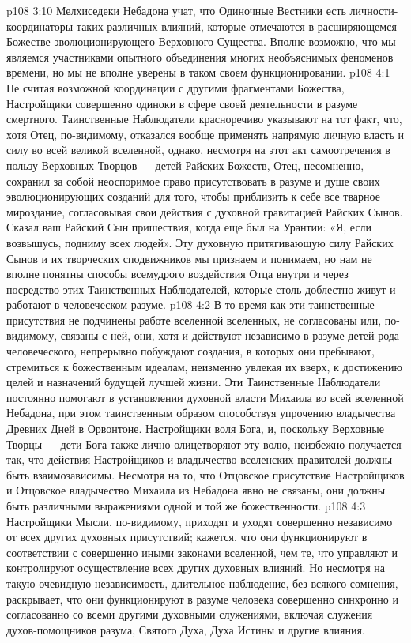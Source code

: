 \vs p108 3:10 Мелхиседеки Небадона учат, что Одиночные Вестники есть личности\hyp{}координаторы таких различных влияний, которые отмечаются в расширяющемся Божестве эволюционирующего Верховного Существа. Вполне возможно, что мы являемся участниками опытного объединения многих необъяснимых феноменов времени, но мы не вполне уверены в таком своем функционировании.
\vs p108 4:1 Не считая возможной координации с другими фрагментами Божества, Настройщики совершенно одиноки в сфере своей деятельности в разуме смертного. Таинственные Наблюдатели красноречиво указывают на тот факт, что, хотя Отец, по\hyp{}видимому, отказался вообще применять напрямую личную власть и силу во всей великой вселенной, однако, несмотря на этот акт самоотречения в пользу Верховных Творцов --- детей Райских Божеств, Отец, несомненно, сохранил за собой неоспоримое право присутствовать в разуме и душе своих эволюционирующих созданий для того, чтобы приблизить к себе все тварное мироздание, согласовывая свои действия с духовной гравитацией Райских Сынов. Сказал ваш Райский Сын пришествия, когда еще был на Урантии: «Я, если возвышусь, подниму всех людей». Эту духовную притягивающую силу Райских Сынов и их творческих сподвижников мы признаем и понимаем, но нам не вполне понятны способы всемудрого воздействия Отца внутри и через посредство этих Таинственных Наблюдателей, которые столь доблестно живут и работают в человеческом разуме.
\vs p108 4:2 В то время как эти таинственные присутствия не подчинены работе вселенной вселенных, не согласованы или, по\hyp{}видимому, связаны с ней, они, хотя и действуют независимо в разуме детей рода человеческого, непрерывно побуждают создания, в которых они пребывают, стремиться к божественным идеалам, неизменно увлекая их вверх, к достижению целей и назначений будущей лучшей жизни. Эти Таинственные Наблюдатели постоянно помогают в установлении духовной власти Михаила во всей вселенной Небадона, при этом таинственным образом способствуя упрочению владычества Древних Дней в Орвонтоне. Настройщики  воля Бога, и, поскольку Верховные Творцы --- дети Бога также лично олицетворяют эту волю, неизбежно получается так, что действия Настройщиков и владычество вселенских правителей должны быть взаимозависимы. Несмотря на то, что Отцовское присутствие Настройщиков и Отцовское владычество Михаила из Небадона явно не связаны, они должны быть различными выражениями одной и той же божественности.
\vs p108 4:3 Настройщики Мысли, по\hyp{}видимому, приходят и уходят совершенно независимо от всех других духовных присутствий; кажется, что они функционируют в соответствии с совершенно иными законами вселенной, чем те, что управляют и контролируют осуществление всех других духовных влияний. Но несмотря на такую очевидную независимость, длительное наблюдение, без всякого сомнения, раскрывает, что они функционируют в разуме человека совершенно синхронно и согласованно со всеми другими духовными служениями, включая служения духов\hyp{}помощников разума, Святого Духа, Духа Истины и другие влияния.
